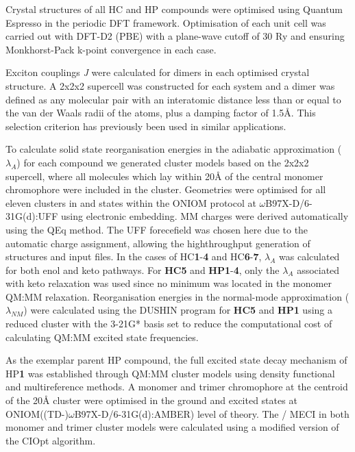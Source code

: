 Crystal structures of all \ac{HC} and \ac{HP} compounds were optimised using Quantum Espresso in the periodic DFT framework.\cite{QE-2009} Optimisation of each unit cell was carried out with DFT-D2 (PBE) with a plane-wave cutoff of 30 Ry and ensuring Monkhorst-Pack k-point convergence in each case.

Exciton couplings \textit{J} were calculated for dimers in each optimised crystal structure. A 2x2x2 supercell was constructed for each system and a dimer was defined as any molecular pair with an interatomic distance less than or equal to the van der Waals radii of the atoms, plus a damping factor of 1.5\AA. This selection criterion has previously been used in similar applications.\cite{Campbell2017} 

To calculate solid state reorganisation energies in the adiabatic approximation ($\lambda_{A}$) for each compound we generated cluster models based on the 2x2x2 supercell, where all molecules which lay within 20{\AA} of the central monomer chromophore were included in the cluster. Geometries were optimised for all eleven clusters in \sone{} and \szero{} states within the ONIOM protocol at $\omega$B97X-D/6-31G(d):UFF using electronic embedding. MM charges were derived automatically using the QEq method.\cite{Rappe2007} The UFF forecefield was chosen here due to the automatic charge assignment, allowing the highthroughput generation of structures and input files. In the cases of \ac{HC}\textbf{1}-\textbf{4} and \ac{HC}\textbf{6}-\textbf{7}, $\lambda_{A}$ was calculated for both enol and keto pathways. For \textbf{HC5} and \textbf{HP1}-\textbf{4}, only the $\lambda_{A}$ associated with keto relaxation was used since no \Estar{} minimum was located in the monomer QM:MM relaxation. Reorganisation energies in the normal-mode approximation ($\lambda_{NM}$) were calculated using the DUSHIN program for \textbf{HC5} and \textbf{HP1} using a reduced cluster with the 3-21G* basis set to reduce the computational cost of calculating QM:MM excited state frequencies.\cite{Reimers2001}

As the exemplar parent \ac{HP} compound, the full excited state decay mechanism of \ac{HP}\textbf{1} was established through QM:MM cluster models using density functional and multireference methods. A monomer and trimer chromophore at the centroid of the 20{\AA} cluster were optimised in the ground and excited states at ONIOM((TD-)$\omega$B97X-D/6-31G(d):AMBER) level of theory. The \sone/\szero{} MECI in both monomer and trimer cluster models were calculated using a modified version of the CIOpt algorithm.\cite{Levine2008} 

